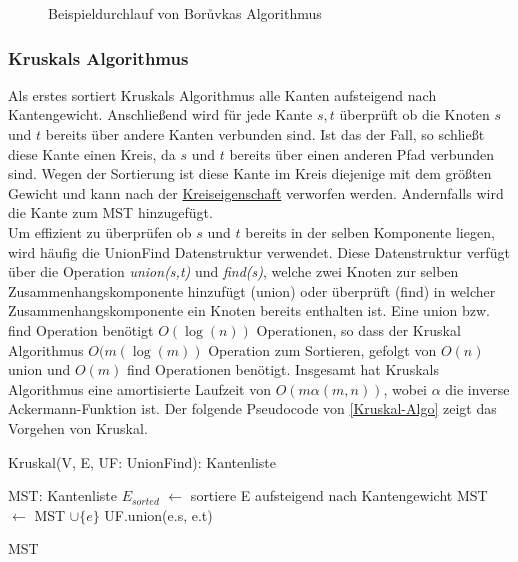 \begin{figure}[H]
    \centering
    
    \caption{Beispieldurchlauf von Bor{\r u}vkas Algorithmus}
    \label{Boruvka-Img}
\end{figure}


\subsubsection{Kruskals Algorithmus}
Als erstes sortiert Kruskals Algorithmus
alle Kanten aufsteigend nach Kantengewicht. Anschließend wird für jede Kante ${s,t}$ überprüft ob die Knoten $s$ und $t$ bereits über andere Kanten verbunden sind. Ist das der Fall, so schließt diese Kante einen Kreis, da $s$ und $t$ bereits über einen anderen Pfad verbunden sind. Wegen der Sortierung ist diese Kante im Kreis diejenige mit dem größten Gewicht und kann nach der \hyperref[Kreiseigenschaft]{Kreiseigenschaft} verworfen werden.
Andernfalls wird die Kante zum MST hinzugefügt.\\
Um effizient zu überprüfen ob $s$ und $t$ bereits in der selben Komponente liegen, wird häufig die UnionFind Datenstruktur verwendet. Diese Datenstruktur verfügt über die Operation \emph{union(s,t)} und \emph{find(s)}, welche zwei Knoten zur selben Zusammenhangskomponente hinzufügt (union) oder überprüft (find) in welcher Zusammenhangskomponente ein Knoten bereits enthalten ist. Eine union bzw. find Operation benötigt $O(\log(n))$ Operationen, so dass der Kruskal Algorithmus $O(m(\log(m))$ Operation zum Sortieren, gefolgt von $O(n)$ union und $O(m)$ find Operationen benötigt.
Insgesamt hat Kruskals Algorithmus eine amortisierte Laufzeit von $O(m \alpha(m,n))$, wobei $\alpha$ die inverse Ackermann-Funktion ist.
Der folgende Pseudocode von \cref{Kruskal-Algo} zeigt das Vorgehen von Kruskal.

\begin{algorithm} 
\caption{Kruskal(V, E, UF: UnionFind): Kantenliste}
\begin{algorithmic}[1]
\label{Kruskal-Algo}

\STATE MST: Kantenliste
\STATE $E_{sorted}$ $\gets$ sortiere E aufsteigend nach Kantengewicht
        \STATE MST $\gets$ MST $\cup \{e\}$ 
        \STATE UF.union(e.s, e.t)
    \ENDIF
\ENDFOR

\RETURN MST

\end{algorithmic}
\end{algorithm}

